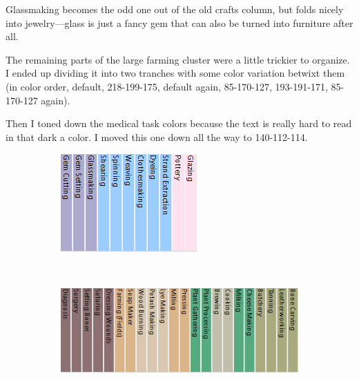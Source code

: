 \documentclass[]{article}
\begin{document}
Glassmaking becomes the odd one out of the old crafts column, but folds nicely into jewelry---glass is
just a fancy gem that can also be turned into furniture after all.
\vspace{12pt}

The remaining parts of the large farming cluster were a little trickier to organize. I ended up dividing
it into two tranches with some color variation betwixt them (in color order, default, 218-199-175,
default again, 85-170-127, 193-191-171, 85-170-127 again).
\vspace{12pt}

Then I toned down the medical task colors because the text is really hard to read in that dark a color. I
moved this one down all the way to 140-112-114.
\vspace{12pt}

\begin{figure}
        \centering
        \begin{subfigure}[H!]{0.32\textwidth}
                \centering
                \includegraphics[width=\textwidth]{Sec3Fig23}
        \end{subfigure} ~~~
        \begin{subfigure}[H!]{0.64\textwidth}
                \centering
                \includegraphics[width=\textwidth]{Sec3Fig25}
        \end{subfigure}
\end{figure}
\end{document}
